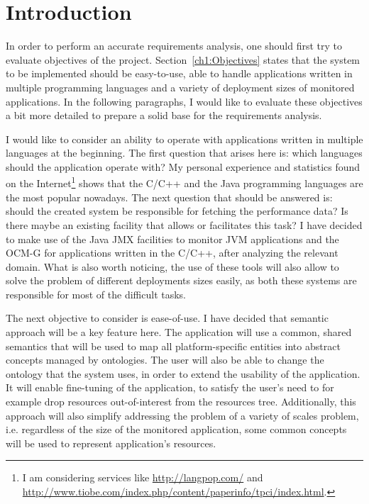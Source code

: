 %

\section{Introduction}
\label{sec:RequirementsIntroduction}

In order to perform an accurate requirements analysis, one should first try to evaluate objectives of the project. Section~\ref{ch1:Objectives} states that the system to be implemented should be easy-to-use, able to handle applications written in multiple programming languages and a variety of deployment sizes of monitored applications. In the following paragraphs, I would like to evaluate these objectives a bit more detailed to prepare a solid base for the requirements analysis.

I would like to consider an ability to operate with applications written in multiple languages at the beginning. The first question that arises here is: which languages should the application operate with? My personal experience and statistics found on the Internet\footnote{I am considering services like \url{http://langpop.com/} and \url{http://www.tiobe.com/index.php/content/paperinfo/tpci/index.html}.} shows that the C/C++ and the Java programming languages are the most popular nowadays. The next question that should be answered is: should the created system be responsible for fetching the performance data? Is there maybe an existing facility that allows or facilitates this task? I have decided to make use of the Java JMX facilities to monitor JVM applications and the OCM-G for applications written in the C/C++, after analyzing the relevant domain. What is also worth noticing, the use of these tools will also allow to solve the problem of different deployments sizes easily, as both these systems are responsible for most of the difficult tasks.

The next objective to consider is ease-of-use. I have decided that semantic approach will be a key feature here. The application will use a common, shared semantics that will be used to map all platform-specific entities into abstract concepts managed by ontologies. The user will also be able to change the ontology that the system uses, in order to extend the usability of the application. It will enable fine-tuning of the application, to satisfy the user\rq{}s need to for example drop resources out-of-interest from the resources tree. Additionally, this approach will also simplify addressing the problem of a variety of scales problem, i.e. regardless of the size of the monitored application, some common concepts will be used to represent application\rq{}s resources.


